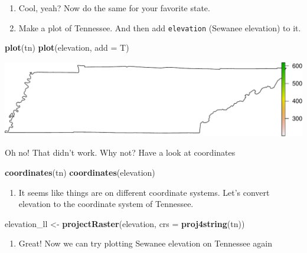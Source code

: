 \documentclass[
]{book}
\newenvironment{Shaded}{\begin{snugshade}}{\end{snugshade}}
\newcommand{\DataTypeTok}[1]{\textcolor[rgb]{0.13,0.29,0.53}{#1}}
\newcommand{\KeywordTok}[1]{\textcolor[rgb]{0.13,0.29,0.53}{\textbf{#1}}}
\newcommand{\NormalTok}[1]{#1}
\newcommand{\StringTok}[1]{\textcolor[rgb]{0.31,0.60,0.02}{#1}}
\providecommand{\tightlist}{%
  \setlength{\itemsep}{0pt}\setlength{\parskip}{0pt}}
\begin{document}
\begin{enumerate}
\def\labelenumi{\arabic{enumi}.}
\setcounter{enumi}{15}
\item
  Cool, yeah? Now do the same for your favorite state.
\item
  Make a plot of Tennessee. And then add \texttt{elevation} (Sewanee elevation) to it.
\end{enumerate}

\begin{Shaded}
\begin{Highlighting}[]
\KeywordTok{plot}\NormalTok{(tn)}
\KeywordTok{plot}\NormalTok{(elevation, }\DataTypeTok{add =}\NormalTok{ T)}
\end{Highlighting}
\end{Shaded}

\includegraphics{figures/unnamed-chunk-423-1.pdf}

Oh no! That didn't work. Why not? Have a look at coordinates

\begin{Shaded}
\begin{Highlighting}[]
\KeywordTok{coordinates}\NormalTok{(tn)}
\KeywordTok{coordinates}\NormalTok{(elevation)}
\end{Highlighting}
\end{Shaded}

\begin{enumerate}
\def\labelenumi{\arabic{enumi}.}
\setcounter{enumi}{17}
\tightlist
\item
  It seems like things are on different coordinate systems. Let's convert elevation to the coordinate system of Tennessee.
\end{enumerate}

\begin{Shaded}
\begin{Highlighting}[]
\NormalTok{elevation_ll <-}\StringTok{ }\KeywordTok{projectRaster}\NormalTok{(elevation, }\DataTypeTok{crs =} \KeywordTok{proj4string}\NormalTok{(tn))}
\end{Highlighting}
\end{Shaded}

\begin{enumerate}
\def\labelenumi{\arabic{enumi}.}
\setcounter{enumi}{18}
\tightlist
\item
  Great! Now we can try plotting Sewanee elevation on Tennessee again
\end{enumerate}
\end{document}
